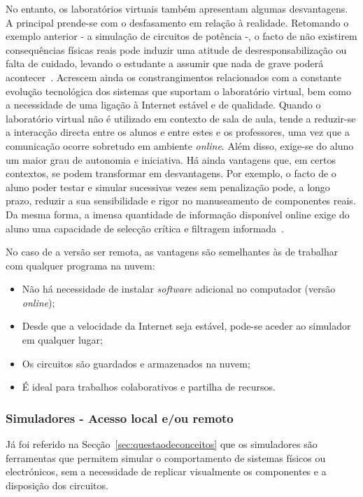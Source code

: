 No entanto, os laboratórios virtuais também apresentam algumas desvantagens. A principal prende-se com o desfasamento em relação à realidade. Retomando o exemplo anterior - a simulação de circuitos de potência -, o facto de não existirem consequências físicas reais pode induzir uma atitude de desresponsabilização ou falta de cuidado, levando o estudante a assumir que nada de grave poderá acontecer~\cite{POTKONJAK2016309}. Acrescem ainda os constrangimentos relacionados com a constante evolução tecnológica dos sistemas que suportam o laboratório virtual, bem como a necessidade de uma ligação à Internet estável e de qualidade. Quando o laboratório virtual não é utilizado em contexto de sala de aula, tende a reduzir-se a interacção directa entre os alunos e entre estes e os professores, uma vez que a comunicação ocorre sobretudo em ambiente \textit{online}. Além disso, exige-se do aluno um maior grau de autonomia e iniciativa. Há ainda vantagens que, em certos contextos, se podem transformar em desvantagens. Por exemplo, o facto de o aluno poder testar e simular sucessivas vezes sem penalização pode, a longo prazo, reduzir a sua sensibilidade e rigor no manuseamento de componentes reais. Da mesma forma, a imensa quantidade de informação disponível online exige do aluno uma capacidade de selecção crítica e filtragem informada~\cite{POTKONJAK2016309, vabtegensVL, Gherasim, Ghergulescu2019Feb}.

No caso de a versão ser remota, as vantagens são semelhantes às de trabalhar com qualquer programa na nuvem:
\begin{itemize}
    \item Não há necessidade de instalar \textit{software} adicional no computador (versão \textit{online});
    \item Desde que a velocidade da Internet seja estável, pode-se aceder ao simulador em qualquer lugar;
    \item Os circuitos são guardados e armazenados na nuvem;
    \item É ideal para trabalhos colaborativos e partilha de recursos.
\end{itemize}

\subsubsection{Simuladores - Acesso local e/ou remoto}
Já foi referido na Secção~\ref{sec:questaodeconceitos} que os simuladores são ferramentas que permitem simular o comportamento de sistemas físicos ou electrónicos, sem a necessidade de replicar visualmente os componentes e a disposição dos circuitos. 

